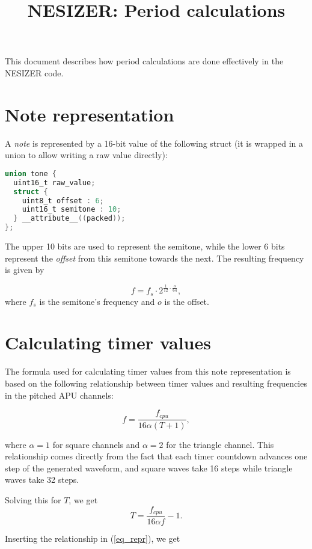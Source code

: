 \documentclass{article}
\title{NESIZER: Period calculations}
\date{}
\begin{document}
\maketitle

This document describes how period calculations are done effectively in the NESIZER code.

\section*{Note representation}

A \emph{note} is represented by a 16-bit value of the following struct (it is wrapped in a union to allow writing a raw value directly):

\begin{lstlisting}[language=C]
union tone {
  uint16_t raw_value;
  struct { 
    uint8_t offset : 6;
    uint16_t semitone : 10;
  } __attribute__((packed));
};
\end{lstlisting}

The upper 10 bits are used to represent the semitone, while the lower 6 bits represent the \emph{offset} from this semitone towards the next. The resulting frequency is given by

\begin{equation}
  f = f_{s} \cdot 2^{\frac{1}{12} \cdot \frac{o}{64}},
\label{eq_repr}
\end{equation}
where $f_s$ is the semitone's frequency and $o$ is the offset. 

\section*{Calculating timer values}

The formula used for calculating timer values from this note representation is based on the following relationship between timer values and resulting frequencies in the pitched APU channels:

$$f = \frac{f_{cpu}}{16 \alpha (T + 1)},$$

where $\alpha = 1$ for square channels and $\alpha = 2$ for the triangle channel. This relationship comes directly from the fact that each timer countdown advances one step of the generated waveform, and square waves take 16 steps while triangle waves take 32 steps.  

Solving this for $T$, we get
$$T = \frac{f_{cpu}}{16 \alpha f} - 1.$$

Inserting the relationship in (\ref{eq_repr}), we get
\end{document}

